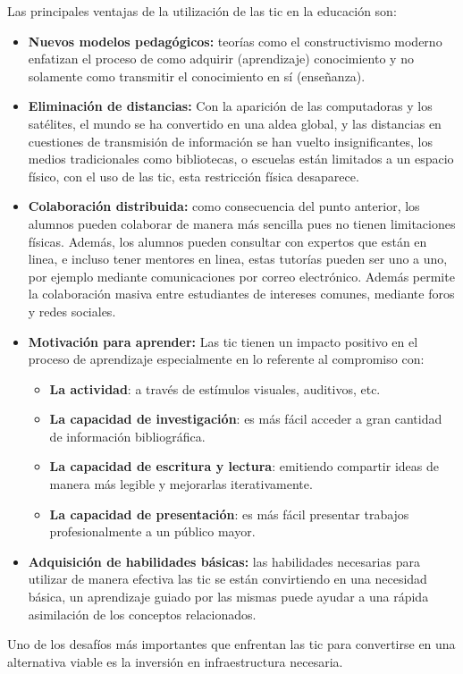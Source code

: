 Las principales ventajas de la utilización de las \Gls{tic} en la educación son:

\begin{itemize}

\item \textbf{Nuevos modelos pedagógicos:} teorías como el constructivismo moderno
    enfatizan el proceso de como adquirir (aprendizaje) conocimiento y no
    solamente como transmitir el conocimiento en sí
    (enseñanza)\cite{guenaga2013serious}.

\item \textbf{Eliminación de distancias:} Con la aparición de las computadoras y los
    satélites,  el mundo se ha convertido en una aldea global, y las distancias
    en cuestiones de transmisión de información se han vuelto
    insignificantes\cite{mohammed2013information},  los medios tradicionales
    como bibliotecas, o escuelas están limitados a un espacio  físico, con el
    uso de las \Gls{tic}, esta restricción física desaparece\cite{tinio:ict}.

\item \textbf{Colaboración distribuida:} como consecuencia del punto anterior, los
    alumnos pueden colaborar de manera más sencilla pues no tienen limitaciones
    físicas. Además, los alumnos pueden consultar con expertos que están en
    linea, e incluso tener mentores en linea, estas tutorías pueden ser uno a
    uno, por ejemplo mediante comunicaciones por correo electrónico. Además
    permite la colaboración masiva entre estudiantes de intereses comunes,
    mediante foros y redes sociales\cite{unesco:ict}.

\item \textbf{Motivación para aprender:} Las \Gls{tic} tienen un impacto
    positivo en el proceso de aprendizaje especialmente en lo referente al
    compromiso
    con\cite{passey2004motivational,egenfeldt2007third,martin2008modelo}:
	    
    \begin{itemize}
    \item \textbf{La actividad}: a través de estímulos visuales, auditivos, etc.
    \item \textbf{La capacidad de investigación}: es más fácil acceder a gran cantidad de
        información bibliográfica.
    \item \textbf{La capacidad de escritura y lectura}: emitiendo compartir  ideas de
        manera más legible y mejorarlas iterativamente.
    \item \textbf{La capacidad de presentación}: es más fácil presentar trabajos
        profesionalmente a un público mayor.
    \end{itemize}
	    
\item \textbf{Adquisición de habilidades básicas:} las habilidades necesarias para
    utilizar de manera efectiva las \Gls{tic} se están convirtiendo en una
    necesidad básica, un aprendizaje guiado por las mismas puede ayudar a una
    rápida asimilación de los conceptos relacionados\cite{martin2008modelo}.

\end{itemize}

Uno de los desafíos más importantes que enfrentan las \Gls{tic} para convertirse
en una alternativa viable es la inversión en infraestructura
necesaria\cite{unesco:ict}.

